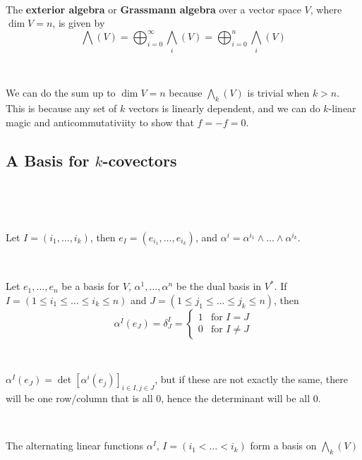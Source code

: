 \documentclass{article}
\begin{document}
\begin{definition}
  \

  The \textbf{exterior algebra} or \textbf{Grassmann algebra} over a vector space $V$, where $\dim V= n$, is given by $$\bigwedge (V) = \bigoplus_{i=0}^\infty \bigwedge_i(V) = \bigoplus_{i=0}^n \bigwedge_i(V)$$
\end{definition}

\begin{remark}
  \

  We can do the sum up to $\dim V = n$ because $\bigwedge_k(V)$ is trivial when $k > n$. This is because any set of $k$ vectors is linearly dependent, and we can do $k$-linear magic and anticommutativiity to show that $f = -f = 0$.
\end{remark}

\subsection{A Basis for $k$-covectors}
\

\begin{remark}
  \

  Let $I = (i_1, \dots, i_k)$, then $e_I = (e_{i_1},\dots, e_{i_k})$, and $\alpha^i = \alpha^{i_1} \wedge \dots \wedge \alpha^{i_k}$.
\end{remark}

\begin{lemma}
  \

  Let $e_1, \dots, e_n$ be a basis for $V$, $\alpha^1, \dots, \alpha^n$ be the dual basis in $V^*$. If $I = (1 \leq i_1 \leq \dots \leq i_k \leq n)$ and $J = (1 \leq j_1 \leq \dots \leq j_k \leq n)$, then $$\alpha^I(e_J) = \delta_J^I =
  \begin{cases}
    1 & \text{for $I = J$}\\
    0 & \text{for $I \neq J$}
  \end{cases}$$
\end{lemma}

\begin{customproof}
  \

  $\alpha^I(e_J) = \det[\alpha^i(e_j)]_{i \in I, j \in J}$, but if these are not exactly the same, there will be one row/column that is all $0$, hence the determinant will be all $0$.
\end{customproof}

\begin{lemma}
  \

  The alternating linear functions $\alpha^I$, $I = (i_1 < \dots < i_k)$ form a basis on $\bigwedge_k(V)$
\end{lemma}
\end{document}
